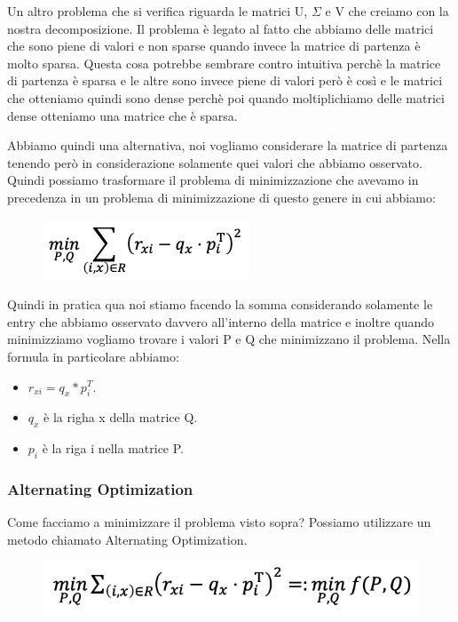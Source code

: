 \documentclass[14pt]{extreport}
\begin{document}
Un altro problema che si verifica riguarda le matrici U, $\Sigma$ e V che creiamo con la nostra decomposizione. Il problema è legato al fatto che
abbiamo delle matrici che sono piene di valori e non sparse quando invece la matrice di partenza è molto sparsa. Questa cosa potrebbe sembrare contro
intuitiva perchè la matrice di partenza è sparsa e le altre sono invece piene di valori però è così e le matrici che otteniamo quindi sono dense
perchè poi quando moltiplichiamo delle matrici dense otteniamo una matrice che è sparsa.

Abbiamo quindi una alternativa, noi vogliamo considerare la matrice di partenza tenendo però in considerazione solamente quei valori che abbiamo
osservato. Quindi possiamo trasformare il problema di minimizzazione che avevamo in precedenza in un problema di minimizzazione di questo genere in
cui abbiamo:


\begin{figure}[H]
	\centering
	\includegraphics[width=0.7\linewidth]{515.jpeg}
\end{figure}

Quindi in pratica qua noi stiamo facendo la somma considerando solamente le entry che abbiamo osservato davvero all'interno della matrice e inoltre
quando minimizziamo vogliamo trovare i valori P e Q che minimizzano il problema. Nella formula in particolare abbiamo:

\begin{itemize}
	\item $r_{xi} = q_x * p_i^T$.
	\item $q_x$ è la righa x della matrice Q.
	\item $p_i$ è la riga i nella matrice P.
\end{itemize}

\subsubsection{Alternating Optimization}

Come facciamo a minimizzare il problema visto sopra? Possiamo utilizzare un metodo chiamato Alternating Optimization.

\begin{figure}[H]
	\centering
	\includegraphics[width=0.7\linewidth]{516.jpeg}
\end{figure}
\end{document}
